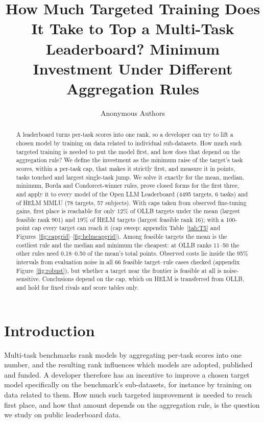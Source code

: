 \documentclass{article}
\title{How Much Targeted Training Does It Take to Top a Multi-Task Leaderboard? Minimum Investment Under Different Aggregation Rules}
\author{Anonymous Authors}
\begin{document}
\maketitle

\begin{abstract}
A leaderboard turns per-task scores into one rank, so a developer can try to lift a chosen model by training on data related to individual sub-datasets. How much such targeted training is needed to put the model first, and how does that depend on the aggregation rule? We define the investment as the minimum raise of the target's task scores, within a per-task cap, that makes it strictly first, and measure it in points, tasks touched and largest single-task jump. We solve it exactly for the mean, median, minimum, Borda and Condorcet-winner rules, prove closed forms for the first three, and apply it to every model of the Open LLM Leaderboard (4495 targets, 6 tasks) and of HELM MMLU (78 targets, 57 subjects). With caps taken from observed fine-tuning gains, first place is reachable for only 12\% of OLLB targets under the mean (largest feasible rank 901) and 19\% of HELM targets (largest feasible rank 16); with a 100-point cap every target can reach it (cap sweep: appendix Table~\ref{tab:T5} and Figures~\ref{fig:capgrid}--\ref{fig:helmcapgrid}). Among feasible targets the mean is the costliest rule and the median and minimum the cheapest: at OLLB ranks 11--50 the other rules need 0.18--0.50 of the mean's total points. Observed costs lie inside the 95\% intervals from evaluation noise in all 66 feasible target--rule cases checked (appendix Figure~\ref{fig:robust}), but whether a target near the frontier is feasible at all is noise-sensitive. Conclusions depend on the cap, which on HELM is transferred from OLLB, and hold for fixed rivals and score tables only.
\end{abstract}

\section{Introduction}
\label{sec:intro}
Multi-task benchmarks rank models by aggregating per-task scores into one number, and the resulting rank influences which models are adopted, published and funded. A developer therefore has an incentive to improve a chosen target model specifically on the benchmark's sub-datasets, for instance by training on data related to them. How much such targeted improvement is needed to reach first place, and how that amount depends on the aggregation rule, is the question we study on public leaderboard data.
\end{document}
